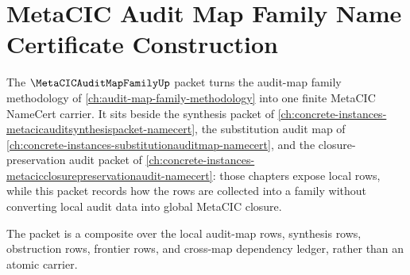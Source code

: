 \chapter{MetaCIC Audit Map Family Name Certificate Construction}
\label{ch:concrete-instances-metacicauditmapfamily-namecert}

The $\MetaCICAuditMapFamilyUp$ packet turns the audit-map family methodology of \autoref{ch:audit-map-family-methodology} into one finite MetaCIC NameCert carrier. It sits beside the synthesis packet of \autoref{ch:concrete-instances-metacicauditsynthesispacket-namecert}, the substitution audit map of \autoref{ch:concrete-instances-substitutionauditmap-namecert}, and the closure-preservation audit packet of \autoref{ch:concrete-instances-metacicclosurepreservationaudit-namecert}: those chapters expose local rows, while this packet records how the rows are collected into a family without converting local audit data into global MetaCIC closure.

The packet is a composite over the local audit-map rows, synthesis rows, obstruction rows, frontier rows, and cross-map dependency ledger, rather than an atomic carrier.

